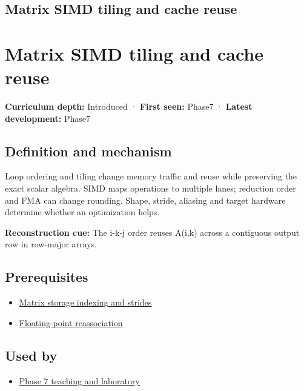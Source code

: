 \hypertarget{appendix-1bfb7c657105}{}
\section*{Matrix SIMD tiling and cache reuse}
\chapter{Matrix SIMD tiling and cache reuse}\label{appendix-1bfb7c657105-matrix-simd-tiling-and-cache-reuse}

\textbf{Curriculum depth:} Introduced · \textbf{First seen:} Phase7 · \textbf{Latest development:} Phase7

\section{Definition and mechanism}\label{appendix-1bfb7c657105-definition-and-mechanism}

Loop ordering and tiling change memory traffic and reuse while preserving the exact scalar algebra. SIMD maps operations to multiple lanes; reduction order and FMA can change rounding. Shape, stride, aliasing and target hardware determine whether an optimization helps.

\textbf{Reconstruction cue:} The i-k-j order reuses A(i,k) across a contiguous output row in row-major arrays.

\section{Prerequisites}\label{appendix-1bfb7c657105-prerequisites}

\begin{itemize}
\tightlist
\item
  \hyperref[appendix-ffdc1d4e5350]{Matrix storage indexing and strides}
\item
  \hyperref[appendix-c2ac4a84c283]{Floating-point reassociation}
\end{itemize}

\section{Used by}\label{appendix-1bfb7c657105-used-by}

\begin{itemize}
\tightlist
\item
  \href{Continuous\%20Notes/Computing\%20Foundations\%20-\%20From\%20Bits\%20to\%20C++\%20and\%20Systems\%20APIs\#Keep\%20the\%20promises\%20visible\%20while\%20moving\%20between\%20representations}{Phase 7 teaching and laboratory}
\end{itemize}

